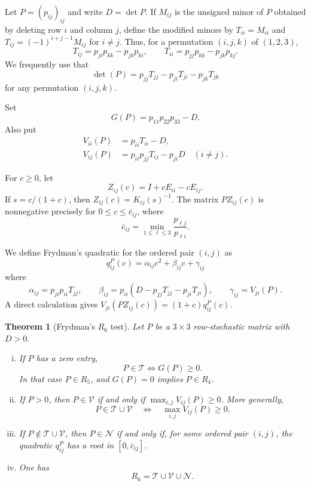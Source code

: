 \documentclass[11pt,onecolumn]{amsart}
\theoremstyle{plain}
\newtheorem{theorem}{Theorem}[section]
\theoremstyle{definition}
\theoremstyle{remark}
\newcommand{\T}{\mathcal T}
\newcommand{\V}{\mathcal V}
\newcommand{\NH}{\mathcal N}
\begin{document}

Let $P=(p_{ij})_{ij}$ and write $D=\det P$.  If $M_{ij}$ is the unsigned
minor of $P$ obtained by deleting row $i$ and column $j$, define the modified minors
by $T_{ii}=M_{ii}$ and $T_{ij}=(-1)^{i+j-1}M_{ij}$ for $i\neq j$.  Thus,
for a permutation $(i,j,k)$ of $(1,2,3)$,
\[
T_{ij}=p_{ji}p_{kk}-p_{jk}p_{ki},
\qquad
T_{ii}=p_{jj}p_{kk}-p_{jk}p_{kj}.
\]
We frequently use  that
\[
\det(P)=p_{jj}T_{jj}-p_{ji}T_{ji}-p_{jk}T_{jk}
\]
for any permutation $(i,j,k)$.

Set
\[
G(P)=p_{11}p_{22}p_{33}-D.
\]
Also put
\begin{align*}
V_{ii}(P) &=p_{ii}T_{ii}-D,\\
V_{ij}(P) &=p_{ii}p_{jj}T_{ij}-p_{ji}D
\quad(i\neq j).
\end{align*}

For $c\geq0$, let
\[
Z_{ij}(c)=I+cE_{ii}-cE_{ij}.
\]
If
$s=c/(1+c)$, then $Z_{ij}(c)=K_{ij}(s)^{-1}$.  The matrix
$PZ_{ij}(c)$ is nonnegative precisely for
$0\leq c\leq\bar c_{ij}$, where
\[
\bar c_{ij}=\min_{1\leq\ell\leq3}\frac{p_{\ell j}}{p_{\ell i}}.
\]

We define Frydman's quadratic for the ordered pair $(i,j)$ as
\[
q_{ij}^P(c)=\alpha_{ij}c^2+\beta_{ij}c+\gamma_{ij}
\]
where
\begin{equation}\label{frydmancoeffs}
\alpha_{ij}=p_{ji}p_{ii}T_{jj},
\qquad
\beta_{ij}=p_{ii}(D-p_{jj}T_{jj}-p_{ji}T_{ji}),
\qquad
\gamma_{ij}=V_{ji}(P).
\end{equation}
A direct calculation gives
$V_{ji}(PZ_{ij}(c))=(1+c)q_{ij}^P(c)$.

\begin{theorem}[Frydman's $R_6$ test]
\label{thm:Frydman-finite-move}
Let $P$ be a $3\times 3$ row-stochastic matrix with $D>0$.
\begin{enumerate}[(i)]
\item If $P$ has a zero entry, 
\[
P\in\T\Longleftrightarrow G(P)\geq 0.
\]
In that case $P\in R_5$, and $G(P)=0$ implies $P\in R_4$.

\item If $P>0$, then $P\in\V$ if and only if
$\max_{i,j}V_{ij}(P)\geq0$.  More generally,
\[
P\in\T\cup\V
\quad\Longleftrightarrow\quad
\max_{i,j}V_{ij}(P)\geq0.
\]

\item If $P\notin\T\cup\V$, then $P\in\NH$ if and only if, for some
ordered pair $(i,j)$, the quadratic $q_{ij}^P$ has a root in
$[0,\bar c_{ij}]$.

\item One has 
\[
R_6=\T\cup\V\cup\NH.
\]
\end{enumerate}
\end{theorem}
\end{document}
